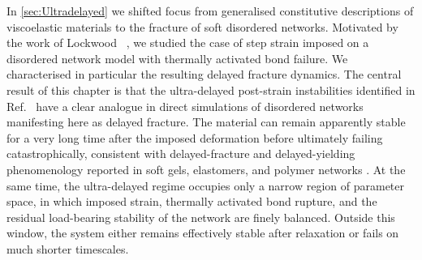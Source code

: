 


In \cref{sec:Ultradelayed} we shifted focus from generalised constitutive descriptions of viscoelastic materials to the fracture of soft disordered networks. Motivated by the work of Lockwood \etal~\cite{lockwood_ultradelayed_2025}, we studied the case of step strain imposed on a disordered network model with thermally activated bond failure. We characterised in particular the resulting delayed fracture dynamics. The central result of this chapter is that the ultra-delayed post-strain instabilities identified in Ref.~\cite{lockwood_ultradelayed_2025} have a clear analogue in direct simulations of disordered networks manifesting here as delayed fracture. The material can remain apparently stable for a very long time after the imposed deformation before ultimately failing catastrophically, consistent with delayed-fracture and delayed-yielding phenomenology reported in soft gels, elastomers, and polymer networks \cite{sprakel_stress_2011,blindstrom_structures_2012,van_der_kooij_laser_2018,wangDelayedFractureGels2012,Ju2023}. At the same time, the ultra-delayed regime occupies only a narrow region of parameter space, in which imposed strain, thermally activated bond rupture, and the residual load-bearing stability of the network are finely balanced. Outside this window, the system either remains effectively stable after relaxation or fails on much shorter timescales.

